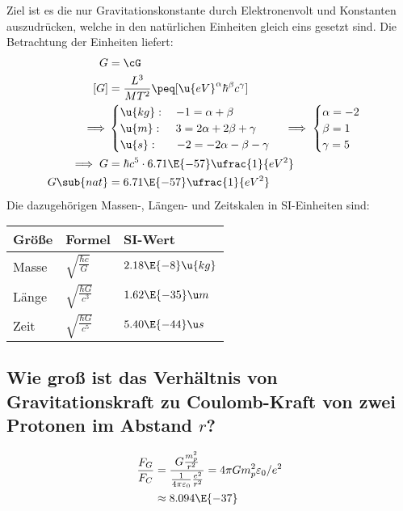 \documentclass[exb]{exercise_5.0}
\begin{document}
\dottedlinett

Ziel ist es die nur Gravitationskonstante durch Elektronenvolt und Konstanten auszudrücken, welche in den natürlichen Einheiten gleich eins gesetzt sind. Die Betrachtung der Einheiten liefert: 
\begin{align*}
    G &= \cG\\
    [G] &= \frac{L^3}{M T^2} \peq[\u{eV}^\alpha\hbar^\beta c^\gamma]\\
    \implies &\begin{cases}
        \u{kg}:\quad  -1 = \alpha+\beta\\
        \u{m}:\quad \, 3 = 2\alpha+2\beta+\gamma\\
        \u{s}:\quad \ \ -2 = -2\alpha - \beta - \gamma
    \end{cases}
    \implies \begin{cases}
        \alpha = -2\\
        \beta = 1\\
        \gamma = 5\\
    \end{cases}\\
    \implies G &= \hbar c^5 \cdot 6.71\E{-57} \ufrac{1}{eV^2}\\
    G\sub{nat} &= 6.71\E{-57} \ufrac{1}{eV^2}
\end{align*}
Die dazugehörigen Massen-, Längen- und Zeitskalen in SI-Einheiten sind:
\begin{table}[H]
\centering
\begin{tabular}{@{}lll@{}}
    \toprule
    {\bf Größe} & {\bf Formel} & {\bf SI-Wert} \\
    \midrule
    Masse & \(\sqrt{\frac{\hbar c}{G}}\) & \(2.18\E{-8}\u{kg}\)\\
    Länge & \(\sqrt{\frac{\hbar G}{c^3}}\) & \(1.62\E{-35}\u m\)\\
    Zeit & \(\sqrt{\frac{\hbar G}{c^5}}\) & \(5.40\E{-44}\u s\)\\
    \bottomrule
\end{tabular}
\end{table}

\subsection{Wie groß ist das Verhältnis von Gravitationskraft zu Coulomb-Kraft von zwei Protonen im Abstand $r$?}

\dottedlinete

\begin{align*}
    \frac{F_G}{F_C} 
    &= \frac{G \frac{m_p^2}{r^2}}{\frac{1}{4\pi\varepsilon_0}\frac{e^2}{r^2}}
    = 4\pi G m_p^2 \varepsilon_0 / e^2\\
    &\approx 8.094\E{-37}
\end{align*}
\end{document}
